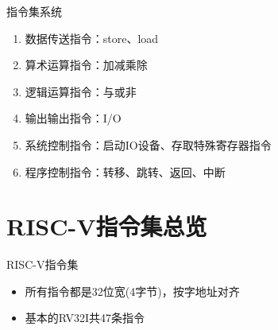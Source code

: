 \documentclass[UTF8]{ctexbeamer}
\begin{document}
\begin{frame}{指令集系统}
\begin{enumerate}
	\item 数据传送指令：store、load
	\item 算术运算指令：加减乘除
	\item 逻辑运算指令：与或非
	\item 输出输出指令：I/O
	\item 系统控制指令：启动IO设备、存取特殊寄存器指令
	\item 程序控制指令：转移、跳转、返回、中断
\end{enumerate}
\end{frame}


\section{RISC-V指令集总览}
\begin{frame}
\sectionpage
\end{frame}

\begin{frame}{RISC-V指令集}
\begin{itemize}
	\item 所有指令都是32位宽(4字节)，按字地址对齐
	\item 基本的RV32I共47条指令
\end{itemize}
\end{frame}
\end{document}
